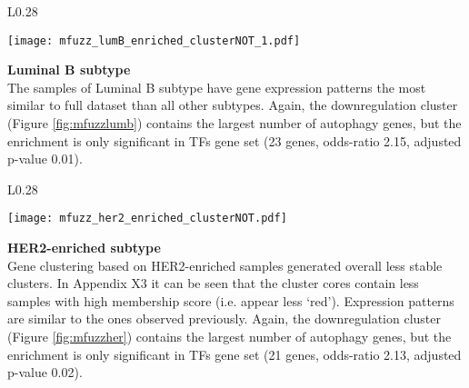         \begin{wrapfigure}{L}{0.28\textwidth}
        \hfill
        \captionsetup{justification=centering}
        \centerline{ \texttt{[image: mfuzz\_lumB\_enriched\_clusterNOT\_1.pdf]}}
        \vspace*{-8mm}
        \caption[Luminal B subtype downregulation cluster]{\label{fig:mfuzzlumb}Luminal B\newline downregulation cluster}
        \end{wrapfigure}
        
        
        \textbf{Luminal B subtype}\\      
        The samples of Luminal B subtype have gene expression patterns the most similar to full dataset than all other subtypes. Again, the downregulation cluster (Figure \ref{fig:mfuzzlumb}) contains the largest number of autophagy genes, but the enrichment is only significant in TFs gene set (23 genes, odds-ratio 2.15, adjusted p-value 0.01). 
        \newline
        \newline
        \newline
        \newline
        \newline

      
        \begin{wrapfigure}{L}{0.28\textwidth}
        \hfill
        \captionsetup{justification=centering}
        \centerline{ \texttt{[image: mfuzz\_her2\_enriched\_clusterNOT.pdf]}}
        \vspace*{-8mm}
        \caption[HER2-enriched subtype downregulation cluster]{\label{fig:mfuzzher}HER2-enriched \newline downregulation cluster}
        \end{wrapfigure}
     
     
        \textbf{HER2-enriched subtype}\\   
        Gene clustering based on HER2-enriched samples generated overall less stable clusters. In Appendix X3 it can be seen that the cluster cores contain less samples with high membership score (i.e. appear less ‘red'). Expression patterns are similar to the ones observed previously. Again, the downregulation cluster (Figure \ref{fig:mfuzzher}) contains the largest number of autophagy genes, but the enrichment is only significant in TFs gene set (21 genes, odds-ratio 2.13, adjusted p-value 0.02).
        \newline
        \newline
        \newline        


